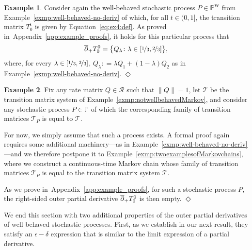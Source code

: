 \documentclass[10pt,a4paper]{paper}
\theoremstyle{definition}
\newtheorem{exmp}{Example}
\newcommand{\processes}{\mathbb{P}}
\newcommand{\wprocesses}{\processes^{\mathrm{W}}}
\newcommand{\norm}[1]{\left\lVert #1 \right\rVert}
\newcommand{\coloneqq}{:\!=}
\newcommand{\exampleend}{\hfill$\Diamond$}
\newcommand{\exampleproofref}{Appendix~\ref{app:example_proofs}}
\begin{document}
\begin{exmp}\label{exmp:outerderivative}
Consider again the well-behaved stochastic process $P\in\wprocesses$ from Example~\ref{exmp:well-behaved-no-deriv} of which, for all $t\in(0,1]$, the transition matrix $T_0^t$ is given by Equation~\eqref{eq:ex4:def}. 
As proved in~\exampleproofref, it holds for this particular process that
\begin{equation*}
\smash{\overline{\partial}}_+T_0^0=\big\{Q_\lambda\colon \lambda\in[\nicefrac{1}{3},\nicefrac{2}{3}]\big\},
\end{equation*}
where, for every $\lambda\in[\nicefrac{1}{3},\nicefrac{2}{3}]$, $Q_\lambda\coloneqq\lambda Q_1+(1-\lambda)Q_2$ as in Example~\ref{exmp:well-behaved-no-deriv}.
\exampleend
\end{exmp}

\begin{exmp}\label{exmp:emptyouterderivative}
Fix any rate matrix $Q\in\mathcal{R}$ such that $\norm{Q}=1$, let $\mathcal{T}$ be the transition matrix system of Example~\ref{exmp:notwellbehavedMarkov}, and consider any stochastic process $P\in\mathbb{P}$ of which the corresponding family of transition matrices $\mathcal{T}_P$ is equal to $\mathcal{T}$.

For now, we simply assume that such a process exists. A formal proof again requires some additional machinery---as in Example~\ref{exmp:well-behaved-no-deriv}---and we therefore postpone it to Example~\ref{exmp:twoexamplesofMarkovchains}, where we construct a continuous-time Markov chain whose family of transition matrices $\mathcal{T}_P$ is equal to the transition matrix system $\mathcal{T}$.

As we prove in~\exampleproofref, for such a stochastic process $P$, the right-sided outer partial derivative $\smash{\overline{\partial}}_+T_0^0$ is then empty.
\exampleend
\end{exmp}

We end this section with two additional properties of the outer partial derivatives of well-behaved stochastic processes. First, as we establish in our next result, they satisfy an $\epsilon-\delta$ expression that is similar to the limit expression of a partial derivative.
\end{document}
